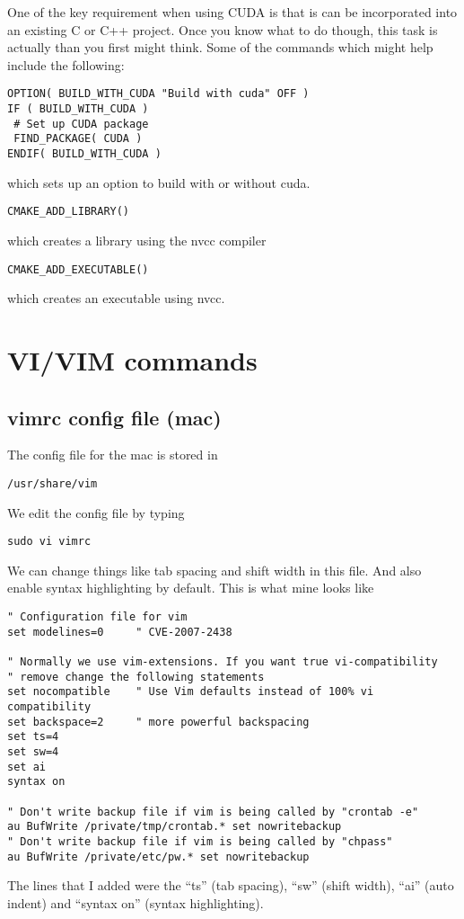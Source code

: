 \documentclass[a4paper, 10pt]{article}
\begin{document}
One of the key requirement when using CUDA is that is can be
incorporated into an existing C or C++ project. Once you know what to
do though, this task is actually than you first might think. Some of
the commands which might help include the following:
\begin{verbatim}
OPTION( BUILD_WITH_CUDA "Build with cuda" OFF )
IF ( BUILD_WITH_CUDA )
 # Set up CUDA package
 FIND_PACKAGE( CUDA )
ENDIF( BUILD_WITH_CUDA )
\end{verbatim}
which sets up an option to build with or without cuda.

\begin{verbatim}
CMAKE_ADD_LIBRARY()
\end{verbatim}
which creates a library using the nvcc compiler

\begin{verbatim}
CMAKE_ADD_EXECUTABLE()
\end{verbatim}
which creates an executable using nvcc.
\section*{VI/VIM commands}

\subsection*{vimrc config file (mac)}

The config file for the mac is stored in 
\begin{verbatim}
/usr/share/vim
\end{verbatim}
We edit the config file by typing
\begin{verbatim}
sudo vi vimrc
\end{verbatim}

We can change things like tab spacing and shift width in this file. And also enable syntax highlighting by default. This is what mine looks like
\begin{verbatim}
" Configuration file for vim
set modelines=0     " CVE-2007-2438

" Normally we use vim-extensions. If you want true vi-compatibility
" remove change the following statements
set nocompatible    " Use Vim defaults instead of 100% vi compatibility
set backspace=2     " more powerful backspacing
set ts=4
set sw=4
set ai
syntax on

" Don't write backup file if vim is being called by "crontab -e"
au BufWrite /private/tmp/crontab.* set nowritebackup
" Don't write backup file if vim is being called by "chpass"
au BufWrite /private/etc/pw.* set nowritebackup
\end{verbatim}
The lines that I added were the ``ts'' (tab spacing), ``sw'' (shift width), ``ai'' (auto indent) and ``syntax on'' (syntax highlighting).
 
\end{document}
